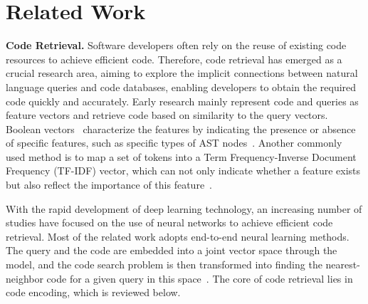 \section{Related Work}
\noindent 
\textbf{Code Retrieval.}
Software developers often rely on the reuse of existing code resources to achieve efficient code. Therefore, code retrieval has emerged as a crucial research area, aiming to explore the implicit connections between natural language queries and code databases, enabling developers to obtain the required code quickly and accurately. Early research mainly represent code and queries as feature vectors and retrieve code based on similarity to the query vectors. Boolean vectors~\citep{salton1983extended} characterize the features by indicating the presence or absence of specific features, such as specific types of AST nodes~\citep{luan2019aroma}. Another commonly used method is to map a set of tokens into a Term Frequency-Inverse Document Frequency (TF-IDF) vector, which can not only indicate whether a feature exists but also reflect the importance of this feature~\citep{diamantopoulos2018codecatch,takuya2011spontaneous}.  

With the rapid development of deep learning technology, an increasing number of studies have focused on the use of neural networks to achieve efficient code retrieval. Most of the related work adopts end-to-end neural learning methods. The query and the code are embedded into a joint vector space through the model, and the code search problem is then transformed into finding the nearest-neighbor code for a given query in this space~\citep{gu2018deep,sun2022code}. 
The core of code retrieval lies in code encoding, which is reviewed below.


